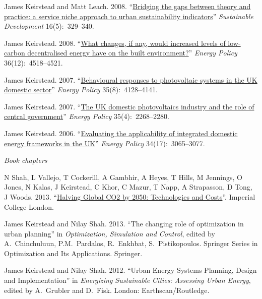 \documentclass[11pt,a4paper]{article}
\begin{document}
\ind James Keirstead and Matt Leach.  2008. ``\href{http://dx.doi.org/10.1002/sd.349}{Bridging the gaps between theory and practice: a service niche approach to urban sustainability indicators}'' \emph{Sustainable Development} 16(5):~329--340.

\ind James Keirstead. 2008. ``\href{http://dx.doi.org/10.1016/j.enpol.2008.09.019}{What changes, if any, would increased levels of low-carbon decentralised energy have on the built environment?}'' \emph{Energy Policy} 36(12):~4518--4521.

\ind James Keirstead. 2007. ``\href{http://dx.doi.org/10.1016/j.enpol.2007.02.019}{Behavioural responses to photovoltaic systems in the UK domestic sector}'' \emph{Energy Policy} 35(8):~4128--4141.

\ind James Keirstead. 2007. ``\href{http://dx.doi.org/10.1016/j.enpol.2006.08.003}{The UK domestic photovoltaics industry and the role of central government}'' \emph{Energy Policy} 35(4):~2268--2280.

\ind James Keirstead. 2006. ``\href{http://dx.doi.org/10.1016/j.enpol.2005.06.004}{Evaluating the applicability of integrated domestic energy frameworks in the UK}'' \emph{Energy Policy} 34(17):~3065--3077.

\bigskip

\noindent\emph{Book chapters \vspace{0.01in}}

\ind N Shah, L Vallejo, T Cockerill, A Gambhir, A Heyes, T Hills, M Jennings, O Jones, N Kalas, J Keirstead, C Khor, C Mazur, T Napp, A Strapasson, D Tong, J Woods. 2013. ``\href{http://www3.imperial.ac.uk/climatechange/publications/collaborative/halving-global-co2-by-2050}{Halving Global CO2 by 2050: Technologies and Costs}''.  Imperial College London.

\ind James Keirstead and Nilay Shah. 2013. ``The changing role of optimization in urban planning'' in \emph{Optimization, Simulation and Control}, edited by A.\ Chinchuluun, P.M.\ Pardalos, R.\ Enkhbat, S.\ Pistikopoulos.  Springer Series in Optimization and Its Applications.  Springer.

\ind James Keirstead and Nilay Shah. 2012. ``Urban Energy Systems Planning, Design and Implementation'' in \emph{Energizing Sustainable Cities: Assessing Urban Energy}, edited by A.\ Grubler and D.\ Fisk. London: Earthscan/Routledge.
\end{document}

